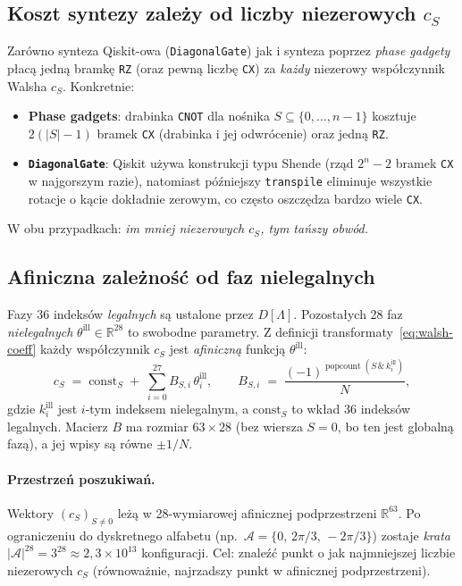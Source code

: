 \documentclass[11pt,a4paper]{article}
\newcommand{\R}{\mathbb{R}}
\newcommand{\1}{\mathbf{1}}
\newcommand{\popcount}{\operatorname{popcount}}
\newcommand{\Alphabet}{\mathcal{A}}
\newcommand{\code}[1]{\texttt{#1}}
\begin{document}
\subsection{Koszt syntezy zależy od liczby niezerowych $c_{S}$}

Zarówno synteza Qiskit-owa (\code{DiagonalGate}) jak i synteza poprzez
\emph{phase gadgety} płacą jedną bramkę \code{RZ} (oraz pewną liczbę
\code{CX}) za \emph{każdy} niezerowy współczynnik Walsha $c_{S}$.
Konkretnie:
\begin{itemize}[leftmargin=*]
  \item \textbf{Phase gadgets}: drabinka \code{CNOT} dla nośnika
        $S\subseteq\{0,\dots,n-1\}$ kosztuje $2(|S|-1)$ bramek
        \code{CX} (drabinka i jej odwrócenie) oraz jedną \code{RZ}.
  \item \textbf{\code{DiagonalGate}}: Qiskit używa konstrukcji typu
        Shende (rząd $2^{n}-2$ bramek \code{CX} w najgorszym razie),
        natomiast późniejszy \code{transpile} eliminuje wszystkie
        rotacje o kącie dokładnie zerowym, co często oszczędza
        bardzo wiele \code{CX}.
\end{itemize}
W obu przypadkach: \emph{im mniej niezerowych $c_{S}$, tym tańszy
obwód.}

\subsection{Afiniczna zależność od faz nielegalnych}

Fazy 36 indeksów \emph{legalnych} są ustalone przez $D[\Lambda]$.
Pozostałych 28 faz \emph{nielegalnych}
$\theta^{\mathrm{ill}}\in\R^{28}$
to swobodne parametry. Z definicji
transformaty~\eqref{eq:walsh-coeff} każdy współczynnik $c_{S}$ jest
\emph{afiniczną} funkcją $\theta^{\mathrm{ill}}$:
\begin{equation}
\label{eq:cS-affine}
c_{S} \;=\; \mathrm{const}_{S} \;+\; \sum_{i=0}^{27}
B_{S,i}\,\theta^{\mathrm{ill}}_{i},
\qquad
B_{S,i} \;=\; \frac{(-1)^{\popcount(S\,\&\, k^{\mathrm{ill}}_{i})}}{N},
\end{equation}
gdzie $k^{\mathrm{ill}}_{i}$ jest $i$-tym indeksem nielegalnym, a
$\mathrm{const}_{S}$ to wkład 36 indeksów legalnych. Macierz $B$ ma
rozmiar $63\times 28$ (bez wiersza $S=0$, bo ten jest globalną fazą),
a jej wpisy są równe $\pm 1/N$.

\paragraph{Przestrzeń poszukiwań.} Wektory $(c_{S})_{S\neq 0}$ leżą
w 28-wymiarowej afinicznej podprzestrzeni $\R^{63}$. Po ograniczeniu do
dyskretnego alfabetu (np.\ $\Alphabet=\{0,\,2\pi/3,\,-2\pi/3\}$) zostaje
\emph{krata} $|\Alphabet|^{28}=3^{28}\approx 2{,}3\times 10^{13}$
konfiguracji. Cel: znaleźć punkt o jak najmniejszej liczbie niezerowych
$c_{S}$ (równoważnie, najrzadszy punkt w afinicznej podprzestrzeni).
\end{document}
